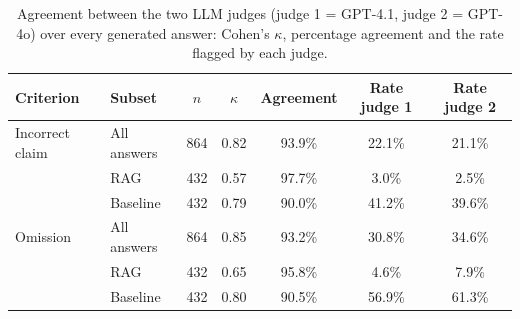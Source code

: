 \begin{table}[H]
\centering
\caption{Agreement between the two LLM judges (judge 1 = GPT-4.1, judge 2 = GPT-4o) over every generated answer: Cohen's $\kappa$, percentage agreement and the rate flagged by each judge.}
\label{tab:judge-llm}
{\footnotesize{}\setlength{\tabcolsep}{4pt}
\begin{tabular}{llccccc}
\toprule
\textbf{Criterion} & \textbf{Subset} & \textbf{$n$} & \textbf{$\kappa$} & \textbf{Agreement} & \textbf{Rate judge 1} & \textbf{Rate judge 2} \\
\midrule
Incorrect claim & All answers & 864 & 0.82 & 93.9\% & 22.1\% & 21.1\% \\
 & RAG & 432 & 0.57 & 97.7\% & 3.0\% & 2.5\% \\
 & Baseline & 432 & 0.79 & 90.0\% & 41.2\% & 39.6\% \\
Omission & All answers & 864 & 0.85 & 93.2\% & 30.8\% & 34.6\% \\
 & RAG & 432 & 0.65 & 95.8\% & 4.6\% & 7.9\% \\
 & Baseline & 432 & 0.80 & 90.5\% & 56.9\% & 61.3\% \\
\bottomrule
\end{tabular}
}
\end{table}
